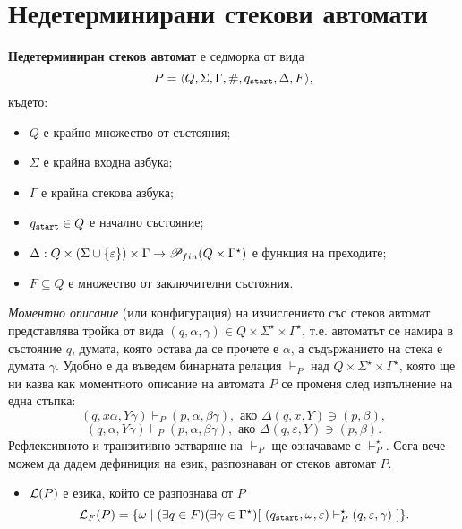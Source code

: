 \section{Недетерминирани стекови автомати}

{\bf Недетерминиран стеков автомат} е седморка от вида
\[P = \langle{Q,\Sigma,\Gamma,\#,q_{\texttt{start}},\Delta,F}\rangle,\] където:
\begin{itemize}
\item
  $Q$ е крайно множество от състояния;
\item  
  $\Sigma$ е крайна входна азбука;
\item
  $\Gamma$ е крайна стекова азбука;
\item
  $q_{\texttt{start}} \in Q$ е начално състояние;
\item
  $\Delta:Q\times(\Sigma \cup \{\varepsilon\})\times\Gamma\rightarrow \mathscr{P}_{fin}(Q\times\Gamma^\star)$ 
  е функция на преходите;    
\item
  $F\subseteq Q$ е множество от заключителни състояния.
\end{itemize}

{\em Моментно описание} (или конфигурация) на изчислението със стеков автомат представлява тройка от вида $(q,\alpha,\gamma) \in Q\times\Sigma^\star\times\Gamma^\star$,
т.е. автоматът се намира в състояние $q$, думата, която остава да се прочете е $\alpha$,
а съдържанието на стека е думата $\gamma$.
Удобно е да въведем бинарната релация $\vdash_P$ над $Q\times\Sigma^\star\times\Gamma^\star$,
която ще ни казва как моментното описание на автомата $P$ се променя след изпълнение на една стъпка:
\[(q,x\alpha,Y\gamma) \vdash_P (p,\alpha,\beta\gamma), \text{ ако } \Delta(q,x,Y) \ni (p,\beta),\]
\[(q,\alpha,Y\gamma) \vdash_P (p,\alpha,\beta\gamma), \text{ ако } \Delta(q,\varepsilon,Y) \ni (p,\beta).\]
Рефлексивното и транзитивно затваряне на $\vdash_P$ ще означаваме с $\vdash^\star_P$.
Сега вече можем да дадем дефиниция на език, разпознаван от стеков автомат $P$.
\begin{itemize}
\item
  $\mathcal{L}(P)$ е езика, който се разпознава от $P$ 
  \[\mathcal{L}_F(P) = \{\omega \mid (\exists q \in F)(\exists \gamma \in \Gamma^\star)[\ (q_{\texttt{start}},\omega,\varepsilon) \vdash^\star_P (q,\varepsilon,\gamma)\ ]\}.\]    
\end{itemize}

